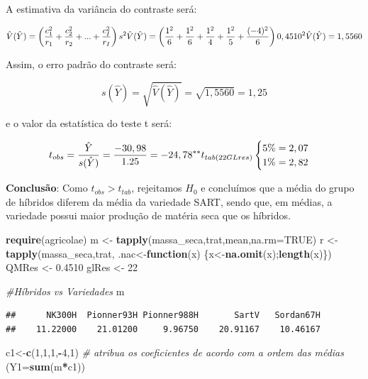 \documentclass[
]{book}
\newenvironment{Shaded}{\begin{snugshade}}{\end{snugshade}}
\newcommand{\CommentTok}[1]{\textcolor[rgb]{0.56,0.35,0.01}{\textit{#1}}}
\newcommand{\ControlFlowTok}[1]{\textcolor[rgb]{0.13,0.29,0.53}{\textbf{#1}}}
\newcommand{\DataTypeTok}[1]{\textcolor[rgb]{0.13,0.29,0.53}{#1}}
\newcommand{\DecValTok}[1]{\textcolor[rgb]{0.00,0.00,0.81}{#1}}
\newcommand{\FloatTok}[1]{\textcolor[rgb]{0.00,0.00,0.81}{#1}}
\newcommand{\KeywordTok}[1]{\textcolor[rgb]{0.13,0.29,0.53}{\textbf{#1}}}
\newcommand{\NormalTok}[1]{#1}
\newcommand{\OperatorTok}[1]{\textcolor[rgb]{0.81,0.36,0.00}{\textbf{#1}}}
\newcommand{\OtherTok}[1]{\textcolor[rgb]{0.56,0.35,0.01}{#1}}
\newcommand{\StringTok}[1]{\textcolor[rgb]{0.31,0.60,0.02}{#1}}
\begin{document}
A estimativa da variância do contraste será:

\[
\hat{V}(\hat{Y}) = \left(\frac{c_1^2}{r_1}+\frac{c_2^2}{r_2}+...+\frac{c_I^2}{r_I} \right)s^2 \\
\hat{V}(\hat{Y}) = \left(\frac{1^2}{6}+\frac{1^2}{6}+\frac{1^2}{4}+\frac{1^2}{5}+\frac{(-4)^2}{6} \right)0,4510^2 \\
\hat{V}(\hat{Y}) = 1,5560
\]

Assim, o erro padrão do contraste será:

\[
s(\hat{Y})=\sqrt{\hat{V}(\hat{Y})} = \sqrt{1,5560}=1,25
\]

e o valor da estatística do teste t será:

\[
t_{obs} = \frac{\hat{Y}}{s(\hat{Y})}=\frac{-30,98}{1.25}=-24,78^{**} \\
t_{tab (22 GLres)} \begin{cases}5\%=2,07\\1\%=2,82 \end{cases}
\]

\textbf{Conclusão}: Como \(t_{obs} > t_{tab}\), rejeitamos \(H_0\) e concluímos que a média do grupo de híbridos diferem da média da variedade SART, sendo que, em médias, a variedade possui maior produção de matéria seca que os híbridos.

\begin{Shaded}
\begin{Highlighting}[]
\KeywordTok{require}\NormalTok{(agricolae)}
\NormalTok{m <-}\StringTok{ }\KeywordTok{tapply}\NormalTok{(massa_seca,trat,mean,}\DataTypeTok{na.rm=}\OtherTok{TRUE}\NormalTok{)}
\NormalTok{r <-}\StringTok{ }\KeywordTok{tapply}\NormalTok{(massa_seca,trat, .nac<-}\ControlFlowTok{function}\NormalTok{(x) \{x<-}\KeywordTok{na.omit}\NormalTok{(x);}\KeywordTok{length}\NormalTok{(x)\})}
\NormalTok{QMRes <-}\StringTok{ }\FloatTok{0.4510}
\NormalTok{glRes <-}\StringTok{ }\DecValTok{22}


\CommentTok{#Híbridos vs Variedades}
\NormalTok{m}
\end{Highlighting}
\end{Shaded}

\begin{verbatim}
##      NK300H  Pionner93H Pionner988H       SartV   Sordan67H 
##    11.22000    21.01200     9.96750    20.91167    10.46167
\end{verbatim}

\begin{Shaded}
\begin{Highlighting}[]
\NormalTok{c1<-}\KeywordTok{c}\NormalTok{(}\DecValTok{1}\NormalTok{,}\DecValTok{1}\NormalTok{,}\DecValTok{1}\NormalTok{,}\OperatorTok{-}\DecValTok{4}\NormalTok{,}\DecValTok{1}\NormalTok{) }\CommentTok{# atribua os coeficientes de acordo com a ordem das médias}
\NormalTok{(}\DataTypeTok{Y1=}\KeywordTok{sum}\NormalTok{(m}\OperatorTok{*}\NormalTok{c1))}
\end{Highlighting}
\end{Shaded}
\end{document}
